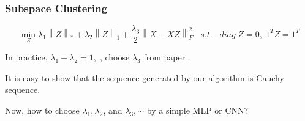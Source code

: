 \documentclass[aspectratio=2516]{beamer}
\begin{document}
\begin{frame}
\frametitle{ Subspace Clustering \uppercase\expandafter{}}

\begin{equation}
\mathop {\min }\limits_Z {\lambda _1}{\left\| Z \right\|_*} + {\lambda _2}{\left\| Z \right\|_1} + \frac{{{\lambda _3}}}{2}\left\| {X - XZ} \right\|_F^2\;\;\;s.t.\;\;\;diag\;Z = 0,\;{1^T}Z = {1^T}
\end{equation}

In practice, ${\lambda _1} + {\lambda _2} = 1,\;$, choose $ \lambda_3 $ from paper {\color{blue}\cite{p3}}.

\vspace{0.5cm}

It is easy to show that the sequence generated by our algorithm is Cauchy sequence.

\vspace{0.5cm}

Now, how to choose $ \lambda_1, \lambda_2 $, and $ \lambda_3, \cdots $ by a simple MLP or CNN?

\end{frame}

\end{document}
